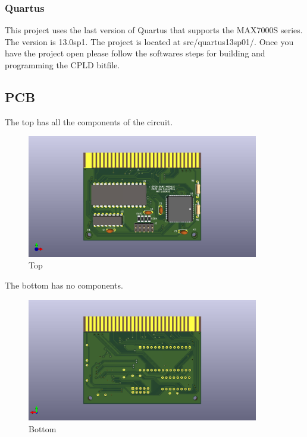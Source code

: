 

\subsubsection{Quartus}
\par
This project uses the last version of Quartus that supports the MAX7000S series. The version is 13.0sp1.
The project is located at src/quartus13sp01/. Once you have the project open please follow the softwares steps
for building and programming the CPLD bitfile.

\subsection{PCB}

\par
The top has all the components of the circuit.

\begin{figure}[h!]
\caption{Top}
\centering
\includegraphics[width=0.90\textwidth,keepaspectratio]{img/ogm_top.png}
\end{figure}

\par
The bottom has no components.

\begin{figure}[h!]
\caption{Bottom}
\centering
\includegraphics[width=0.90\textwidth,keepaspectratio]{img/ogm_bottom.png}
\end{figure}

